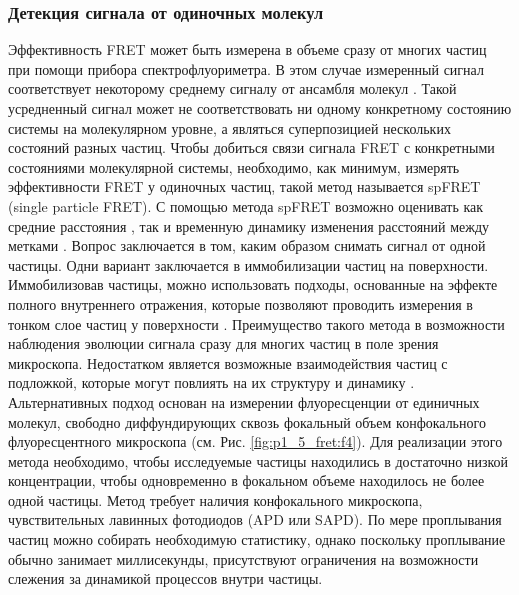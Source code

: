 \subsubsection{Детекция сигнала от одиночных молекул}
    Эффективность FRET может быть измерена в объеме сразу от многих частиц при помощи прибора спектрофлуориметра. В этом случае измеренный сигнал соответствует некоторому среднему сигналу от ансамбля молекул \cite{klose_simulation_2012}. Такой усредненный сигнал может не соответствовать ни одному конкретному состоянию системы на молекулярном уровне, а являться суперпозицией нескольких состояний разных частиц. Чтобы добиться связи сигнала FRET с конкретными состояниями молекулярной системы, необходимо, как минимум, измерять эффективности FRET у одиночных частиц, такой метод называется spFRET (single particle FRET). С помощью метода spFRET возможно оценивать как средние расстояния \cite{okumus_vesicle_2004}, так и временную динамику изменения расстояний между метками \cite{li_rapid_2005}. Вопрос заключается в том, каким образом снимать сигнал от одной частицы. Одни вариант заключается в иммобилизации частиц на поверхности. Иммобилизовав частицы, можно использовать подходы, основанные на эффекте полного внутреннего отражения, которые позволяют проводить измерения в тонком слое частиц у поверхности \cite{roy_practical_2008}. Преимущество такого метода в возможности наблюдения эволюции сигнала сразу для многих частиц в поле зрения микроскопа. Недостатком является возможные взаимодействия частиц с подложкой, которые могут повлиять на их структуру и динамику \cite{zanetti-domingues_hydrophobic_2013}. Альтернативных подход основан на измерении флуоресценции от единичных молекул, свободно диффундирующих сквозь фокальный объем конфокального флуоресцентного микроскопа (см. Рис. \ref{fig:p1_5_fret:f4}). Для реализации этого метода необходимо, чтобы исследуемые частицы находились в достаточно низкой концентрации, чтобы одновременно в фокальном объеме находилось не более одной частицы. Метод требует наличия конфокального микроскопа, чувствительных лавинных фотодиодов (APD или SAPD). По мере проплывания частиц можно собирать необходимую статистику, однако поскольку проплывание обычно занимает миллисекунды, присутствуют ограничения на возможности слежения за динамикой процессов внутри частицы. 

